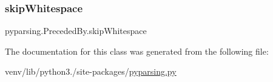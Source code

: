 \mbox{\label{classpyparsing_1_1PrecededBy_ad055a25db4c390dedef38a28649e5bae}} 
\subsubsection{\texorpdfstring{skip\+Whitespace}{skipWhitespace}}
{\footnotesize\ttfamily pyparsing.\+Preceded\+By.\+skip\+Whitespace}



The documentation for this class was generated from the following file\+:\begin{DoxyCompactItemize}
\item 
venv/lib/python3./site-\/packages/\hyperlink{pyparsing_8py}{pyparsing.\+py}\end{DoxyCompactItemize}
